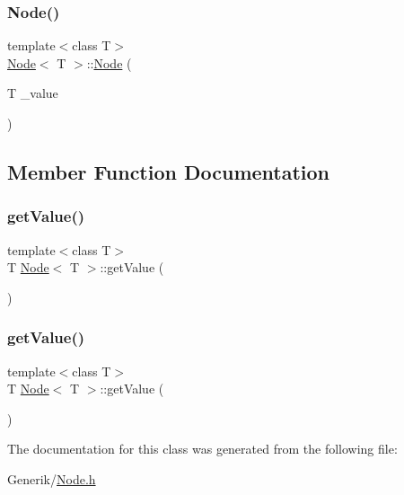 \subsubsection{\texorpdfstring{Node()}{Node()}\hspace{0.1cm}{\footnotesize\ttfamily [2/2]}}
{\footnotesize\ttfamily template$<$class T$>$ \\
\mbox{\hyperlink{classNode}{Node}}$<$ T $>$\+::\mbox{\hyperlink{classNode}{Node}} (\begin{DoxyParamCaption}\item[{T}]{\+\_\+value }\end{DoxyParamCaption})}



\subsection{Member Function Documentation}
\mbox{\label{classNode_a8a9d6500c263a8338c1b763f44f8dadd}} 
\subsubsection{\texorpdfstring{getValue()}{getValue()}\hspace{0.1cm}{\footnotesize\ttfamily [1/2]}}
{\footnotesize\ttfamily template$<$class T$>$ \\
T \mbox{\hyperlink{classNode}{Node}}$<$ T $>$\+::get\+Value (\begin{DoxyParamCaption}{ }\end{DoxyParamCaption})}

\mbox{\label{classNode_a8a9d6500c263a8338c1b763f44f8dadd}} 
\subsubsection{\texorpdfstring{getValue()}{getValue()}\hspace{0.1cm}{\footnotesize\ttfamily [2/2]}}
{\footnotesize\ttfamily template$<$class T$>$ \\
T \mbox{\hyperlink{classNode}{Node}}$<$ T $>$\+::get\+Value (\begin{DoxyParamCaption}{ }\end{DoxyParamCaption})}



The documentation for this class was generated from the following file\+:\begin{DoxyCompactItemize}
\item 
Generik/\mbox{\hyperlink{Generik_2Node_8h}{Node.\+h}}\end{DoxyCompactItemize}
